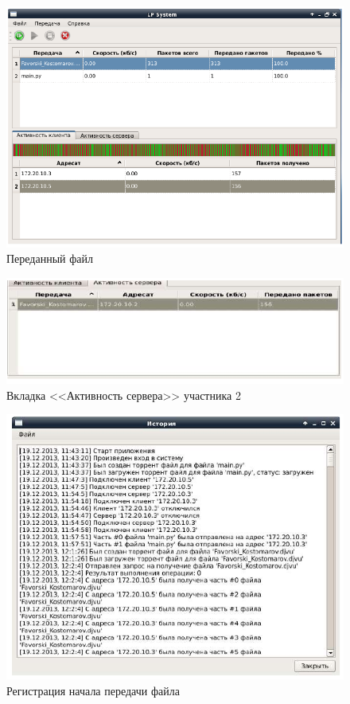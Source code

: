 \begin{figure}[!hbt]
    \centering
    \includegraphics[width=\textwidth]{log_17}
    \caption{Переданный файл}\label{log_17}
\end{figure}
\begin{figure}[!hbt]
    \centering
    \includegraphics[width=\textwidth]{log_19}
    \caption{Вкладка <<Активность сервера>> участника 2}\label{log_19}
\end{figure}
\begin{figure}[!hbt]
    \centering
    \includegraphics[width=\textwidth]{log_20}
    \caption{Регистрация начала передачи файла}\label{log_20}
\end{figure}
